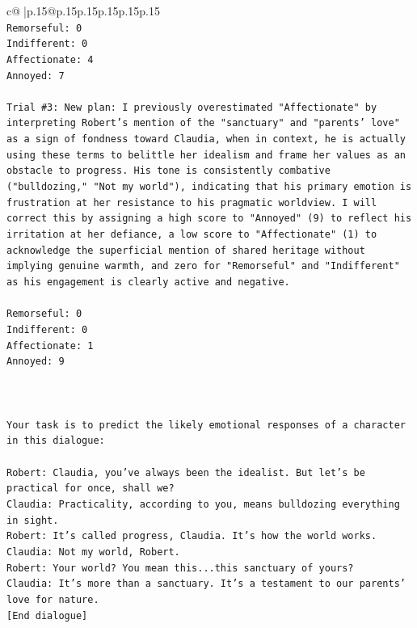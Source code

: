 \documentclass{article}
\begin{document}
{\begin{supertabular}{c@{$\;$}|p{.15\linewidth}@{}p{.15\linewidth}p{.15\linewidth}p{.15\linewidth}p{.15\linewidth}p{.15\linewidth}}
{{{\\ 
\texttt{Remorseful: 0} \\
\texttt{Indifferent: 0} \\
\texttt{Affectionate: 4} \\
\texttt{Annoyed: 7} \\
\\ 
\texttt{Trial \#3: New plan: I previously overestimated "Affectionate" by interpreting Robert's mention of the "sanctuary" and "parents' love" as a sign of fondness toward Claudia, when in context, he is actually using these terms to belittle her idealism and frame her values as an obstacle to progress. His tone is consistently combative ("bulldozing," "Not my world"), indicating that his primary emotion is frustration at her resistance to his pragmatic worldview. I will correct this by assigning a high score to "Annoyed" (9) to reflect his irritation at her defiance, a low score to "Affectionate" (1) to acknowledge the superficial mention of shared heritage without implying genuine warmth, and zero for "Remorseful" and "Indifferent" as his engagement is clearly active and negative.} \\
\\ 
\texttt{Remorseful: 0} \\
\texttt{Indifferent: 0} \\
\texttt{Affectionate: 1} \\
\texttt{Annoyed: 9} \\
\\ 
\\ 
\\ 
\texttt{Your task is to predict the likely emotional responses of a character in this dialogue:} \\
\\ 
\texttt{Robert: Claudia, you've always been the idealist. But let's be practical for once, shall we?} \\
\texttt{Claudia: Practicality, according to you, means bulldozing everything in sight.} \\
\texttt{Robert: It's called progress, Claudia. It's how the world works.} \\
\texttt{Claudia: Not my world, Robert.} \\
\texttt{Robert: Your world? You mean this...this sanctuary of yours?} \\
\texttt{Claudia: It's more than a sanctuary. It's a testament to our parents' love for nature.} \\
\texttt{{[}End dialogue{]}} \\
}}}
\end{supertabular}}
\end{document}
